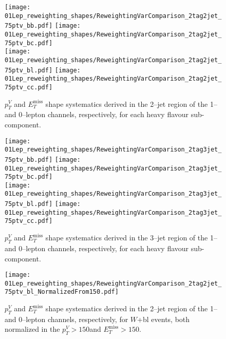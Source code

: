 \begin{figure}[ht!]
  \centering
  \texttt{[image: 01Lep\_reweighting\_shapes/ReweightingVarComparison\_2tag2jet\_75ptv\_bb.pdf]}
  \texttt{[image: 01Lep\_reweighting\_shapes/ReweightingVarComparison\_2tag2jet\_75ptv\_bc.pdf]}
  \\
  \texttt{[image: 01Lep\_reweighting\_shapes/ReweightingVarComparison\_2tag2jet\_75ptv\_bl.pdf]}
  \texttt{[image: 01Lep\_reweighting\_shapes/ReweightingVarComparison\_2tag2jet\_75ptv\_cc.pdf]}
  \\
  \caption{$p_T^V$ and $E_T^{\text{miss}}$ shape systematics derived in the
    2--jet region of the 1-- and 0--lepton channels, respectively, for each
    heavy flavour sub-component.}
  
  \label{fig:wjets_01lep_2jet_SysWPtVBDTr}
\end{figure}

\begin{figure}[ht!]
  \centering
  \texttt{[image: 01Lep\_reweighting\_shapes/ReweightingVarComparison\_2tag3jet\_75ptv\_bb.pdf]}
  \texttt{[image: 01Lep\_reweighting\_shapes/ReweightingVarComparison\_2tag3jet\_75ptv\_bc.pdf]}
  \\
  \texttt{[image: 01Lep\_reweighting\_shapes/ReweightingVarComparison\_2tag3jet\_75ptv\_bl.pdf]}
  \texttt{[image: 01Lep\_reweighting\_shapes/ReweightingVarComparison\_2tag3jet\_75ptv\_cc.pdf]}
  \\
  \caption{$p_T^V$ and $E_T^{\text{miss}}$ shape systematics derived in the
    3--jet region of the 1-- and 0--lepton channels, respectively, for each
    heavy flavour sub-component.}
  \label{fig:wjets_01lep_3jet_SysWPtVBDTr}
\end{figure}

\begin{figure}[ht!]
  \centering
  \texttt{[image: 01Lep\_reweighting\_shapes/ReweightingVarComparison\_2tag2jet\_75ptv\_bl\_NormalizedFrom150.pdf]}
  \caption{$p_T^V$ and $E_T^{\text{miss}}$ shape systematics derived in the
    2--jet region of the 1-- and 0--lepton channels, respectively, for $W$+bl
    events, both normalized in the $p_T^V > 150$\GeV and $E_T^{\text{miss}} >
    150$\GeV.}
  \label{fig:wjets_01lep_2jet_bl_SysWPtVBDTr_From150}
\end{figure}